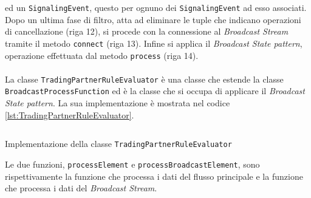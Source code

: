 ed un \texttt{SignalingEvent}, questo per ognuno dei \texttt{SignalingEvent} ad esso associati.
Dopo un ultima fase di filtro, atta ad eliminare le tuple che indicano operazioni di cancellazione (riga 12), si procede con la connessione al \textit{Broadcast Stream}
tramite il metodo \texttt{connect} (riga 13).
Infine si applica il \textit{Broadcast State pattern}, operazione effettuata dal metodo \texttt{process} (riga 14).\\\\
La classe \texttt{TradingPartnerRuleEvaluator} è una classe che estende la classe \texttt{BroadcastProcessFunction} ed è la classe che si occupa di applicare il \textit{Broadcast State pattern}.
La sua implementazione è mostrata nel codice \ref{lst:TradingPartnerRuleEvaluator}.
\begin{code}
    \inputminted[linenos,fontsize=\footnotesize]{java}{listings/EventsExport/TradingPartnerRuleEvaluator.java}
    \caption{Implementazione della classe \texttt{TradingPartnerRuleEvaluator}}
    \label{lst:TradingPartnerRuleEvaluator}
\end{code}
Le due funzioni, \texttt{processElement} e \texttt{processBroadcastElement}, sono rispettivamente la funzione che processa i dati del flusso principale e la funzione che processa i dati del \textit{Broadcast Stream}.
